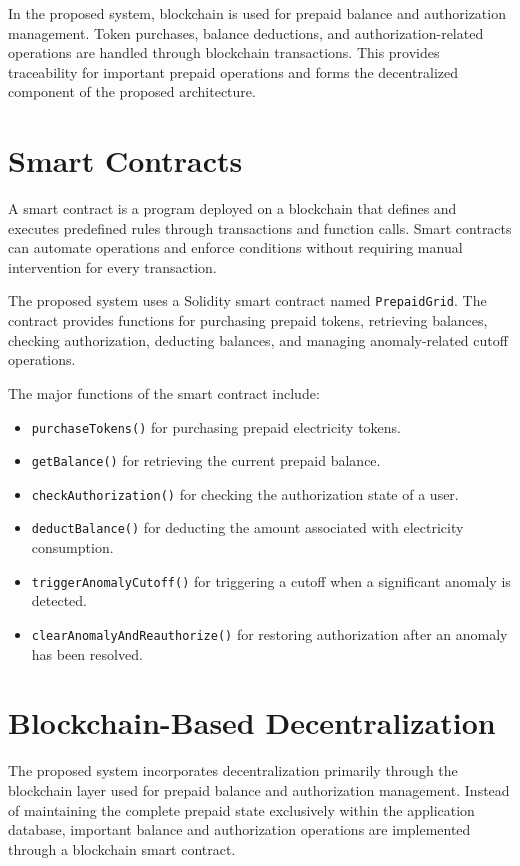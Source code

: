 In the proposed system, blockchain is used for prepaid balance and authorization management. Token purchases, balance deductions, and authorization-related operations are handled through blockchain transactions. This provides traceability for important prepaid operations and forms the decentralized component of the proposed architecture.


\section{Smart Contracts}

A smart contract is a program deployed on a blockchain that defines and executes predefined rules through transactions and function calls. Smart contracts can automate operations and enforce conditions without requiring manual intervention for every transaction.

The proposed system uses a Solidity smart contract named \texttt{PrepaidGrid}. The contract provides functions for purchasing prepaid tokens, retrieving balances, checking authorization, deducting balances, and managing anomaly-related cutoff operations.

The major functions of the smart contract include:

\begin{itemize}
    \item \texttt{purchaseTokens()} for purchasing prepaid electricity tokens.
    \item \texttt{getBalance()} for retrieving the current prepaid balance.
    \item \texttt{checkAuthorization()} for checking the authorization state of a user.
    \item \texttt{deductBalance()} for deducting the amount associated with electricity consumption.
    \item \texttt{triggerAnomalyCutoff()} for triggering a cutoff when a significant anomaly is detected.
    \item \texttt{clearAnomalyAndReauthorize()} for restoring authorization after an anomaly has been resolved.
\end{itemize}


\section{Blockchain-Based Decentralization}

The proposed system incorporates decentralization primarily through the blockchain layer used for prepaid balance and authorization management. Instead of maintaining the complete prepaid state exclusively within the application database, important balance and authorization operations are implemented through a blockchain smart contract.

